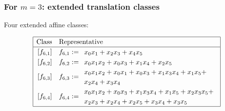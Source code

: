 \documentclass[pdf,sprung,slideColor,nocolorBG]{beamer}
\begin{document}
\begin{frame}
\frametitle{For $m=3$: extended translation classes}

Four extended affine classes:

\begin{align*}
\def\arraystretch{1.2}
\begin{array}{|cl|}
\hline
\text{Class} &
\text{Representative}
\\
\hline
\,[f_{6,1}] & f_{6,1} := 
\begin{array}{l}
x_{0} x_{1} + x_{2} x_{3} + x_{4} x_{5}
\end{array}
\\
\,[f_{6,2}] & f_{6,2} := 
\begin{array}{l}
x_{0} x_{1} x_{2} + x_{0} x_{3} + x_{1} x_{4} + x_{2} x_{5}
\end{array}
\\
\,[f_{6,3}] & f_{6,3} := 
\begin{array}{l}
x_{0} x_{1} x_{2} + x_{0} x_{1} + x_{0} x_{3} + x_{1} x_{3} x_{4} + x_{1} x_{5} + 
\\
x_{2} x_{4} + x_{3} x_{4}
\end{array}
\\
\,[f_{6,4}] & f_{6,4} := 
\begin{array}{l}
x_{0} x_{1} x_{2} + x_{0} x_{3} + x_{1} x_{3} x_{4} + x_{1} x_{5} + x_{2} x_{3} x_{5} + 
\\
x_{2} x_{3} + x_{2} x_{4} + x_{2} x_{5} + x_{3} x_{4} + x_{3} x_{5}
\end{array}
\\
\hline
\end{array}
\end{align*}
\end{frame}
% 
% 
% 
\end{document}
